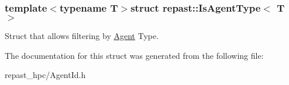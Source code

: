 \subsubsection*{template$<$typename T$>$struct repast\-::\-Is\-Agent\-Type$<$ T $>$}

Struct that allows filtering by \hyperlink{classrepast_1_1_agent}{Agent} Type. 

The documentation for this struct was generated from the following file\-:\begin{DoxyCompactItemize}
\item 
repast\-\_\-hpc/Agent\-Id.\-h\end{DoxyCompactItemize}
